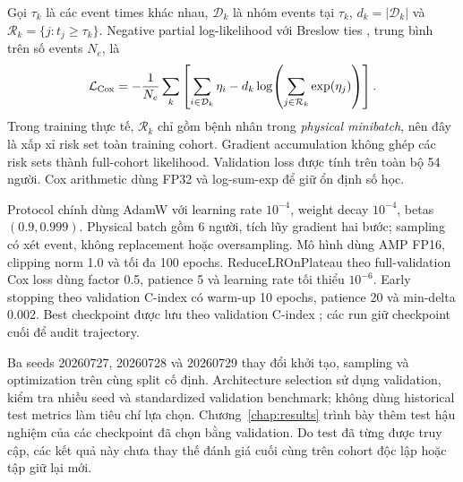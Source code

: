 Gọi $\tau_k$ là các event times khác nhau, $\mathcal D_k$ là nhóm events tại $\tau_k$, $d_k=|\mathcal D_k|$ và $\mathcal R_k=\{j:t_j\geq\tau_k\}$. Negative partial log-likelihood với Breslow ties \cite{breslow1974covariance}, trung bình trên số events $N_e$, là
\begin{equation}
 \mathcal L_{\rm Cox}=-\frac{1}{N_e}\sum_k
 \left[\sum_{i\in\mathcal D_k}\eta_i
 -d_k\log\!\left(\sum_{j\in\mathcal R_k}\exp(\eta_j)\right)\right].
 \label{eq:cox-method}
\end{equation}
Trong training thực tế, $\mathcal R_k$ chỉ gồm bệnh nhân trong \emph{physical minibatch}, nên đây là xấp xỉ risk set toàn training cohort. Gradient accumulation không ghép các risk sets thành full-cohort likelihood. Validation loss được tính trên toàn bộ 54 người. Cox arithmetic dùng FP32 và log-sum-exp để giữ ổn định số học.

Protocol chính dùng AdamW \cite{loshchilov2019adamw} với learning rate $10^{-4}$, weight decay $10^{-4}$, betas $(0.9,0.999)$. Physical batch gồm 6 người, tích lũy gradient hai bước; sampling có xét event, không replacement hoặc oversampling. Mô hình dùng AMP FP16, clipping norm 1.0 và tối đa 100 epochs. ReduceLROnPlateau theo full-validation Cox loss dùng factor 0.5, patience 5 và learning rate tối thiểu $10^{-6}$. Early stopping theo validation C-index có warm-up 10 epochs, patience 20 và min-delta 0.002. Best checkpoint được lưu theo validation C-index \cite{harrell1996multivariable}; các run giữ checkpoint cuối để audit trajectory.

Ba seeds 20260727, 20260728 và 20260729 thay đổi khởi tạo, sampling và optimization trên cùng split cố định. Architecture selection sử dụng validation, kiểm tra nhiều seed và standardized validation benchmark; không dùng historical test metrics làm tiêu chí lựa chọn. Chương~\ref{chap:results} trình bày thêm test hậu nghiệm của các checkpoint đã chọn bằng validation. Do test đã từng được truy cập, các kết quả này chưa thay thế đánh giá cuối cùng trên cohort độc lập hoặc tập giữ lại mới.
